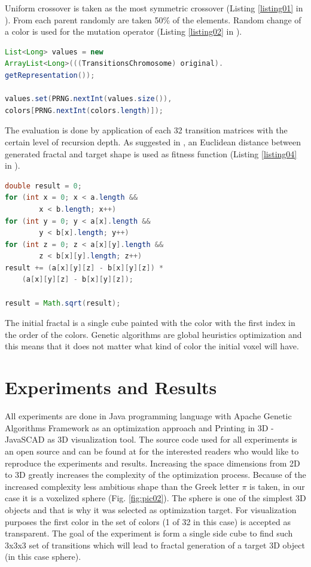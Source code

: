 \documentclass[runningheads]{llncs}
\begin{document}
Uniform crossover is taken as the most symmetric crossover (Listing \ref{listing01} in \cite{balabanov01}). From each parent randomly are taken 50\% of the elements. Random change of a color is used for the mutation operator (Listing \ref{listing02} in \cite{balabanov01}). 

\begin{lstlisting}[language=Java, caption=Color mutation of a single voxel., label=listing02]
List<Long> values = new 
ArrayList<Long>(((TransitionsChromosome) original).
getRepresentation());

values.set(PRNG.nextInt(values.size()), 
colors[PRNG.nextInt(colors.length)]);
\end{lstlisting}

The evaluation is done by application of each 32 transition matrices with the certain level of recursion depth. As suggested in \cite{guerin01}, an Euclidean distance between generated fractal and target shape is used as fitness function (Listing \ref{listing04} in \cite{balabanov01}). 

\begin{lstlisting}[language=Java, caption=Euclidean distance between voxels., label=listing04]
double result = 0;
for (int x = 0; x < a.length && 
		x < b.length; x++)
for (int y = 0; y < a[x].length && 
		y < b[x].length; y++)
for (int z = 0; z < a[x][y].length && 
		z < b[x][y].length; z++)
result += (a[x][y][z] - b[x][y][z]) * 
	(a[x][y][z] - b[x][y][z]);

result = Math.sqrt(result);
\end{lstlisting}

The initial fractal is a single cube painted with the color with the first index in the order of the colors. Genetic algorithms are global heuristics optimization and this means that it does not matter what kind of color the initial voxel will have. 

\section{Experiments and Results} \label{Experiments and Results}

All experiments are done in Java programming language with Apache Genetic Algorithms Framework \cite{apache01} as an optimization approach and Printing in 3D - JavaSCAD \cite{printing01} as 3D visualization tool. The source code used for all experiments is an open source and can be found at \cite{balabanov01} for the interested readers who would like to reproduce the experiments and results. Increasing the space dimensions from 2D to 3D greatly increases the complexity of the optimization process. Because of the increased complexity less ambitious shape than the Greek letter $\pi$ is taken, in our case it is a voxelized sphere (Fig. \ref{fig:pic02}). The sphere is one of the simplest 3D objects and that is why it was selected as optimization target. For visualization purposes the first color in the set of colors (1 of 32 in this case) is accepted as transparent. The goal of the experiment is form a single side cube to find such 3x3x3 set of transitions which will lead to fractal generation of a target 3D object (in this case sphere).
\end{document}
